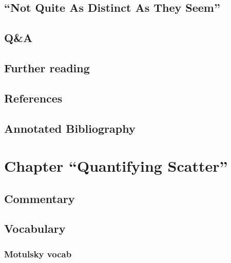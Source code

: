\documentclass[]{book}
\theoremstyle{definition}
\theoremstyle{definition}
\theoremstyle{definition}
\theoremstyle{remark}
\begin{document}
\section{\texorpdfstring{``Not Quite As Distinct As They
Seem''}{Not Quite As Distinct As They Seem}}\label{not-quite-as-distinct-as-they-seem}

\section{Q\&A}\label{qa}

\section*{Further reading}\label{further-reading-3}

\section*{References}\label{references-3}

\section*{Annotated Bibliography}\label{annotated-bibliography-3}

\chapter{\texorpdfstring{Chapter ``Quantifying
Scatter''}{Chapter Quantifying Scatter}}\label{chapter-quantifying-scatter}

\section*{Commentary}\label{commentary-4}

\section*{Vocabulary}\label{vocabulary-5}

\subsection{Motulsky vocab}\label{motulsky-vocab-5}
\end{document}
